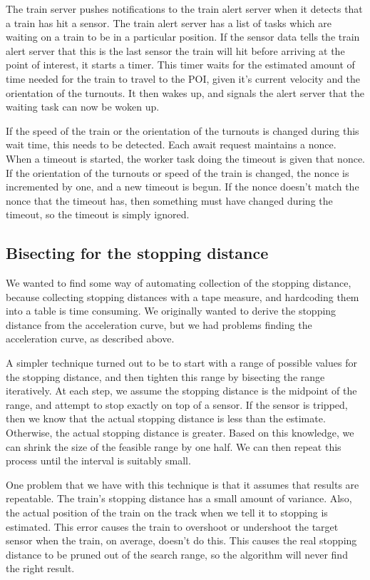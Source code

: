 \documentclass[titlepage]{article}
\begin{document}
The train server pushes notifications to the train alert server when
it detects that a train has hit a sensor.
The train alert server has a list of tasks which are waiting on a train
to be in a particular position.
If the sensor data tells the train alert server that this is the last
sensor the train will hit before arriving at the point of interest,
it starts a timer.
This timer waits for the estimated amount of time needed for the train
to travel to the POI, given it's current velocity and the orientation
of the turnouts.
It then wakes up, and signals the alert server that the waiting task can
now be woken up.

If the speed of the train or the orientation of the turnouts is changed
during this wait time, this needs to be detected.
Each await request maintains a nonce.
When a timeout is started, the worker task doing the timeout is given
that nonce.
If the orientation of the turnouts or speed of the train is changed,
the nonce is incremented by one, and a new timeout is begun.
If the nonce doesn't match the nonce that the timeout has, then something
must have changed during the timeout, so the timeout is simply ignored.

\subsection{Bisecting for the stopping distance}
We wanted to find some way of automating collection of the stopping distance,
because collecting stopping distances with a tape measure, and hardcoding
them into a table is time consuming.
We originally wanted to derive the stopping distance from the acceleration curve,
but we had problems finding the acceleration curve, as described above.

A simpler technique turned out to be to start with a range of possible
values for the stopping distance, and then tighten this range by bisecting
the range iteratively.
At each step, we assume the stopping distance is the midpoint of
the range, and attempt to stop exactly on top of a sensor.
If the sensor is tripped, then we know that the actual stopping distance
is less than the estimate.
Otherwise, the actual stopping distance is greater.
Based on this knowledge, we can shrink the size of the feasible range by
one half.
We can then repeat this process until the interval is suitably small.

One problem that we have with this technique is that it assumes that results
are repeatable.
The train's stopping distance has a small amount of variance.
Also, the actual position of the train on the track when we tell it to stopping
is estimated.
This error causes the train to overshoot or undershoot the target sensor when
the train, on average, doesn't do this.
This causes the real stopping distance to be pruned out of the search range, so
the algorithm will never find the right result.
\end{document}
